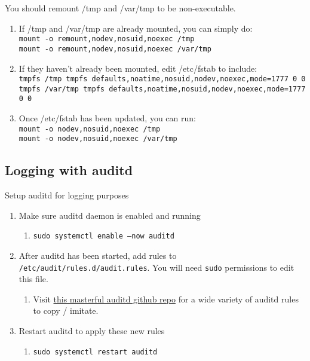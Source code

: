 \documentclass[12pt,letterpaper]{article}
\def\code#1{\textcolor{iris}{\texttt{#1}}}
\begin{document}
You should remount /tmp and /var/tmp to be non-executable.
\begin{enumerate}
	\item If /tmp and /var/tmp are already mounted, you can simply do: \code{ \\
		mount -o remount,nodev,nosuid,noexec /tmp \\
		mount -o remount,nodev,nosuid,noexec /var/tmp }
	\item If they haven't already been mounted, edit /etc/fstab to include: \code{ \\
		tmpfs /tmp tmpfs defaults,noatime,nosuid,nodev,noexec,mode=1777 0 0 \\
		tmpfs /var/tmp tmpfs defaults,noatime,nosuid,nodev,noexec,mode=1777 0 0 }
	\item Once /etc/fstab has been updated, you can run: \code{ \\
		mount -o nodev,nosuid,noexec /tmp \\
		mount -o nodev,nosuid,noexec /var/tmp }
\end{enumerate}

\subsection{Logging with auditd}

Setup auditd for logging purposes
\begin{enumerate}
	\item Make sure auditd daemon is enabled and running
		\begin{enumerate}
			\item \code{sudo systemctl enable --now auditd}
		\end{enumerate}
	\item After auditd has been started, add rules to \code{/etc/audit/rules.d/audit.rules}. You will need \code{sudo} permissions to edit this file.
		\begin{enumerate}
			\item Visit \href{https://github.com/Neo23x0/auditd/blob/master/audit.rules}{this masterful auditd github repo} for a wide variety of auditd rules to copy / imitate.
		\end{enumerate}
	\item Restart auditd to apply these new rules
		\begin{enumerate}
			\item \code{sudo systemctl restart auditd}
		\end{enumerate}
\end{enumerate}
\end{document}
